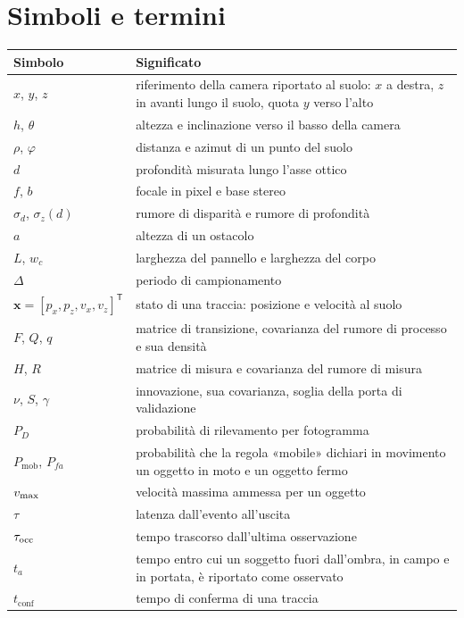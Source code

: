 \section*{Simboli e termini}\label{sec:simboli}

{\small
\begin{tabularx}{\textwidth}{@{}p{2.6cm}L@{}}
\toprule
Simbolo & Significato\\
\midrule
$x$, $y$, $z$ & riferimento della camera riportato al suolo: $x$ a destra, $z$ in avanti lungo il suolo, quota $y$ verso l'alto\\
$h$, $\theta$ & altezza e inclinazione verso il basso della camera\\
$\rho$, $\varphi$ & distanza e azimut di un punto del suolo\\
$d$ & profondità misurata lungo l'asse ottico\\
$f$, $b$ & focale in pixel e base stereo\\
$\sigma_d$, $\sigma_z(d)$ & rumore di disparità e rumore di profondità\\
$a$ & altezza di un ostacolo\\
$L$, $w_c$ & larghezza del pannello e larghezza del corpo\\
$\Delta$ & periodo di campionamento\\
$\mathbf x=[p_x,p_z,v_x,v_z]^{\mathsf T}$ & stato di una traccia: posizione e velocità al suolo\\
$F$, $Q$, $q$ & matrice di transizione, covarianza del rumore di processo e sua densità\\
$H$, $R$ & matrice di misura e covarianza del rumore di misura\\
$\nu$, $S$, $\gamma$ & innovazione, sua covarianza, soglia della porta di validazione\\
$P_D$ & probabilità di rilevamento per fotogramma\\
$P_{\mathrm{mob}}$, $P_{fa}$ & probabilità che la regola «mobile» dichiari in movimento un oggetto in moto e un oggetto fermo\\
$v_{\max}$ & velocità massima ammessa per un oggetto\\
$\tau$ & latenza dall'evento all'uscita\\
$\tau_{\mathrm{occ}}$ & tempo trascorso dall'ultima osservazione\\
$t_a$ & tempo entro cui un soggetto fuori dall'ombra, in campo e in portata, è riportato come osservato\\
$t_{\mathrm{conf}}$ & tempo di conferma di una traccia\\

\end{tabularx}}
